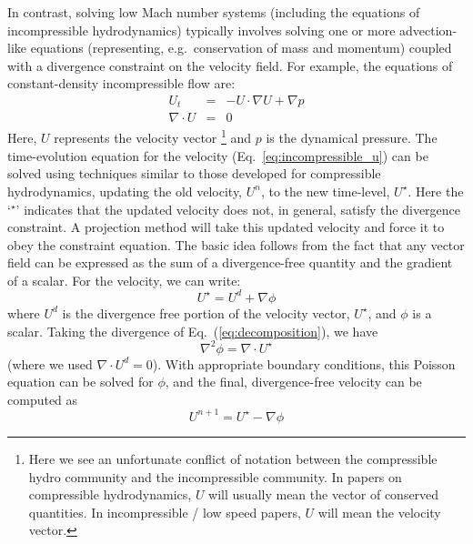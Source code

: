In contrast, solving low Mach number systems (including the equations of
incompressible hydrodynamics) typically involves solving one or more
advection-like equations (representing, e.g.\ conservation of mass and
momentum) coupled with a divergence constraint on the velocity field.
For example, the equations of constant-density incompressible flow
are:
\begin{eqnarray}
U_t &=& -U \cdot \nabla U + \nabla p \label{eq:incompressible_u} \\
\nabla \cdot U &=& 0
\end{eqnarray}
Here, $U$ represents the velocity vector%
%
\footnote{Here we see an unfortunate conflict
of notation between the compressible hydro community and the
incompressible community.  In papers on compressible hydrodynamics,
$U$ will usually mean the vector of conserved quantities.  In 
incompressible / low speed papers, $U$ will mean the velocity vector.}
%
and $p$ is the dynamical pressure.  The time-evolution equation for
the velocity (Eq.~\ref{eq:incompressible_u}) can be solved using
techniques similar to those developed for compressible hydrodynamics,
updating the old velocity, $U^n$, to the new time-level, $U^\star$.
Here the `$^\star$' indicates that the updated velocity does not, in
general, satisfy the divergence constraint.  A projection method will
take this updated velocity and force it to obey the constraint
equation.  The basic idea follows from the fact that any vector
field can be expressed as the sum of a divergence-free quantity and
the gradient of a scalar.  For the velocity, we can write:
\begin{equation}
U^\star = U^d + \nabla \phi \label{eq:decomposition}
\end{equation}
where $U^d$ is the divergence free portion of the velocity vector,
$U^\star$, and $\phi$ is a scalar.  Taking the divergence of
Eq.~(\ref{eq:decomposition}), we have
\begin{equation}
\nabla^2 \phi = \nabla \cdot U^\star
\end{equation}
(where we used $\nabla \cdot U^d = 0$).
With appropriate boundary conditions, this Poisson equation can be
solved for $\phi$, and the final, divergence-free velocity can 
be computed as
\begin{equation}
U^{n+1} = U^\star - \nabla \phi
\end{equation}

